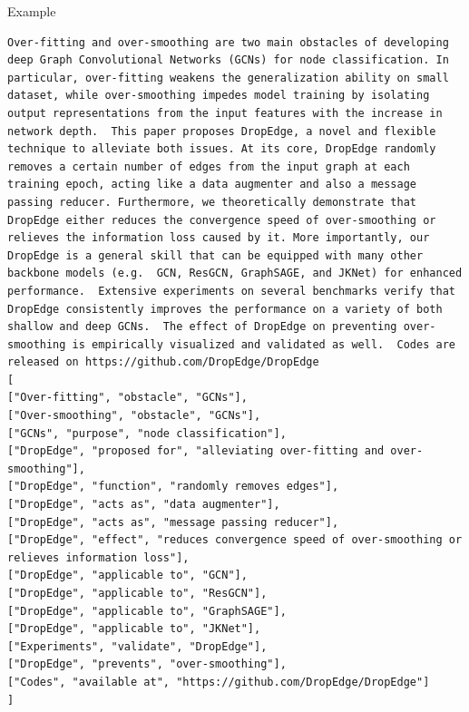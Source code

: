 \documentclass[aspectratio=1610,xcolor={dvipsnames},hyperref={colorlinks,unicode,linkcolor=violet,anchorcolor=BlueViolet,citecolor=YellowOrange,filecolor=black,urlcolor=Aquamarine}]{beamer}
\begin{document}
\begin{frame}{Example}
\begin{verbatim}
Over-fitting and over-smoothing are two main obstacles of developing deep Graph Convolutional Networks (GCNs) for node classification. In particular, over-fitting weakens the generalization ability on small dataset, while over-smoothing impedes model training by isolating output representations from the input features with the increase in network depth.  This paper proposes DropEdge, a novel and flexible technique to alleviate both issues. At its core, DropEdge randomly removes a certain number of edges from the input graph at each training epoch, acting like a data augmenter and also a message passing reducer. Furthermore, we theoretically demonstrate that DropEdge either reduces the convergence speed of over-smoothing or relieves the information loss caused by it. More importantly, our DropEdge is a general skill that can be equipped with many other backbone models (e.g.  GCN, ResGCN, GraphSAGE, and JKNet) for enhanced performance.  Extensive experiments on several benchmarks verify that DropEdge consistently improves the performance on a variety of both shallow and deep GCNs.  The effect of DropEdge on preventing over-smoothing is empirically visualized and validated as well.  Codes are released on https://github.com/DropEdge/DropEdge
[
["Over-fitting", "obstacle", "GCNs"],
["Over-smoothing", "obstacle", "GCNs"],
["GCNs", "purpose", "node classification"],
["DropEdge", "proposed for", "alleviating over-fitting and over-smoothing"],
["DropEdge", "function", "randomly removes edges"],
["DropEdge", "acts as", "data augmenter"],
["DropEdge", "acts as", "message passing reducer"],
["DropEdge", "effect", "reduces convergence speed of over-smoothing or relieves information loss"],
["DropEdge", "applicable to", "GCN"],
["DropEdge", "applicable to", "ResGCN"],
["DropEdge", "applicable to", "GraphSAGE"],
["DropEdge", "applicable to", "JKNet"],
["Experiments", "validate", "DropEdge"],
["DropEdge", "prevents", "over-smoothing"],
["Codes", "available at", "https://github.com/DropEdge/DropEdge"]
]


\end{verbatim}
\end{frame}
\end{document}
